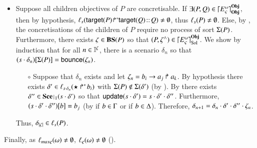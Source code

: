\begin{proofapproxinf}
\begin{itemize}
  \item Suppose all children objectives of $P$ are concretisable.
    If $\exists (P, Q) \in \lceil E_\varsigma^\omega\rceil^{\mathbf{Obj}}_{\mathbf{Obj}}$, then by hypothesis,
      $\ell_{s}({\mathsf{target}(P)\!\Rsh^*\!\!\mathsf{target}(Q)} \!::\! Q) \neq \emptyset$, thus
      $\ell_{s}(P) \neq \emptyset$.
    Else, by , the concretisations of the children of $P$ require no process of sort $\Sigma(P)$.
      Furthermore, there exists $\zeta \in \mathbf{BS}(P)$ so that $(P, \zeta^\wedge) \in \lceil E_\varsigma^\omega\rceil^{\mathbf{Obj}}_{\mathrm{Sol}}$.
      We show by induction that for all $n \in \mathbb{I}^{\zeta}$, there is a scenario $\delta_n$ so that ${(s \cdot \delta_n)[\Sigma(P)]} = \mathsf{bounce}(\zeta_n)$.
      \begin{itemize}
        \item[$\circ$] Suppose that $\delta_n$ exists and let $\zeta_n = b_i\rightarrow a_j\Rsh a_k$.
        By hypothesis there exists $\delta' \in \ell_{s \cdot \delta_n}(\mbox{$\star\Rsh^*\!b_i$})$ with $\Sigma(P) \notin \Sigma(\delta')$ (by ).
        By  there exists $\delta'' \in \restriction{\Sce}{1}(s \PHplay \delta')$ so that $\mathsf{update}(s \cdot \delta') = s \cdot \delta' \cdot \delta''$.
        Furthermore, ${(s \cdot \delta' \cdot \delta'')[b]} = b_j$ (by
		 if $b \in \Gamma$ or  if $b \in \Delta$).
        Therefore, $\delta_{n+1} = \delta_n \cdot \delta' \cdot \delta'' \cdot \zeta_n$.
      \end{itemize}
      Thus, $\delta_{|\zeta|} \in \ell_s(P)$. %
\end{itemize}
Finally, as $\ell_{max\varsigma}(\omega) \neq \emptyset$, $\ell_\varsigma(\omega) \neq
\emptyset$ ().
\end{proofapproxinf}
